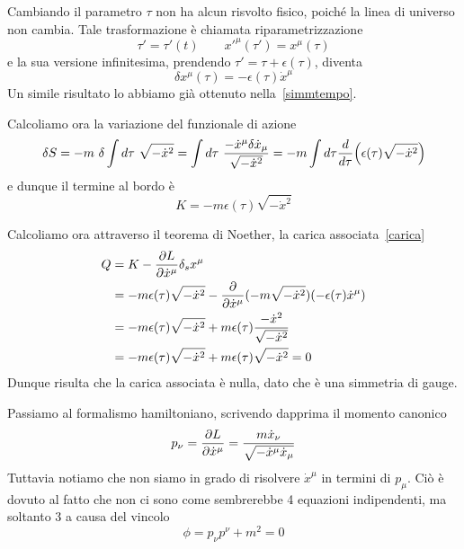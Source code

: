     Cambiando il parametro $\tau$ non ha alcun risvolto fisico, poiché la linea di universo non cambia. Tale trasformazione è chiamata riparametrizzazione
    \begin{equation*}
        \tau' = \tau'(t) \qquad x'^\mu (\tau') = x^\mu(\tau)
    \end{equation*} 
    e la sua versione infinitesima, prendendo $\tau' = \tau + \epsilon(\tau)$, diventa
    \begin{equation*}
        \delta x^\mu(\tau) = - \epsilon(\tau) \dot x^\mu
    \end{equation*}
    Un simile risultato lo abbiamo già ottenuto nella~\eqref{simmtempo}.
    
    Calcoliamo ora la variazione del funzionale di azione 
    \begin{equation*}
        \delta S = - m ~ \delta \int d\tau ~ \sqrt{- \dot x^2} = \int d\tau ~ \frac{- \dot x^\mu \delta \dot x_\mu}{\sqrt{- \dot x^2}} = - m \int d\tau \frac{d}{d\tau} \Big ( \epsilon(\tau) \sqrt{- \dot x^2} \Big)
    \end{equation*}
    e dunque il termine al bordo è 
    \begin{equation*}
        K = - m \epsilon(\tau) \sqrt{- \dot x^2}
    \end{equation*}

    Calcoliamo ora attraverso il teorema di Noether, la carica associata~\eqref{carica}
    \begin{equation*}
    \begin{aligned}
        Q & = K - \frac{\partial L}{\partial\dot x^\mu} \delta_s x^\mu \\ & =  - m \epsilon(\tau) \sqrt{- \dot x^2} - \frac{\partial}{\partial\dot x^\mu} (- m \sqrt{- \dot x^2} ) (- \epsilon(\tau) \dot x^\mu) \\ & = - m \epsilon(\tau) \sqrt{- \dot x^2} + m \epsilon(\tau) \frac{- \dot x^2}{\sqrt{- \dot x^2}} \\ & = - m \epsilon(\tau) \sqrt{- \dot x^2} + m \epsilon(\tau) \sqrt{- \dot x^2} = 0
    \end{aligned}
    \end{equation*}
    Dunque risulta che la carica associata è nulla, dato che è una simmetria di gauge. 

    Passiamo al formalismo hamiltoniano, scrivendo dapprima il momento canonico 
\begin{equation*}
    p_\nu = \frac{\partial L}{\partial\dot x^\mu} = \frac{m \dot x_\nu}{\sqrt{- \dot x^\mu \dot x_\mu}}
\end{equation*}
    Tuttavia notiamo che non siamo in grado di risolvere $\dot x^\mu$ in termini di $p_\mu$. Ciò è dovuto al fatto che non ci sono come sembrerebbe 4 equazioni indipendenti, ma soltanto 3 a causa del vincolo 
\begin{equation*}
    \phi = p_\nu p^\nu + m^2 = 0
\end{equation*}

